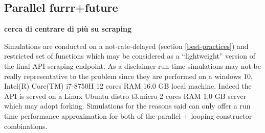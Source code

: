 \documentclass[
  12pt,
  a4paper,
  oneside]{book}
\theoremstyle{definition}
\theoremstyle{definition}
\theoremstyle{definition}
\theoremstyle{remark}
\begin{document}
\hypertarget{parallel-furrrfuture}{%
\subsection{Parallel furrr+future}\label{parallel-furrrfuture}}

\textbf{cerca di centrare di più su scraping}

Simulations are conducted on a not-rate-delayed (section \ref{best-practices}) and restricted set of functions which may be considered as a ``lightweight'' version of the final API scraping endpoint.
As a disclaimer run time simulations may not be really representative to the problem since they are performed on a windows 10, Intel(R) Core(TM) i7-8750H 12 cores RAM 16.0 GB local machine. Indeed the API is served on a Linux Ubuntu distro t3.micro 2 cores RAM 1.0 GB server which may adopt forking. Simulations for the reasons said can only offer a run time performance approximation for both of the parallel + looping constructor combinations.
\end{document}
